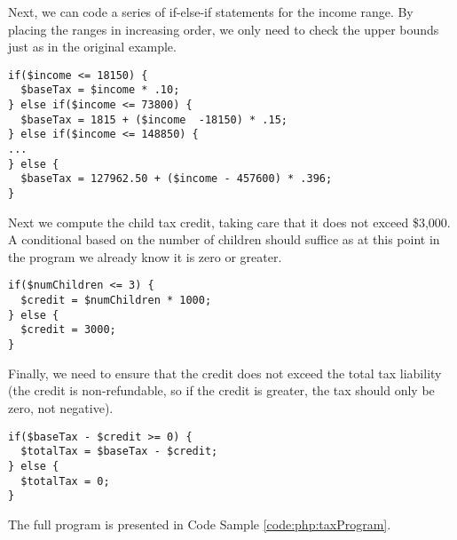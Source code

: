 Next, we can code a series of if-else-if statements for the income range.  By
placing the ranges in increasing order, we only need to check the upper bounds
just as in the original example.

\begin{verbatim}
if($income <= 18150) {
  $baseTax = $income * .10;
} else if($income <= 73800) {
  $baseTax = 1815 + ($income  -18150) * .15;
} else if($income <= 148850) {
...
} else {
  $baseTax = 127962.50 + ($income - 457600) * .396;
}
\end{verbatim}

Next we compute the child tax credit, taking care that it does
not exceed \$3,000.  A conditional based on the number of children
should suffice as at this point in the program we already know it is
zero or greater.

\begin{verbatim}
if($numChildren <= 3) {
  $credit = $numChildren * 1000;
} else {
  $credit = 3000;
}
\end{verbatim}

Finally, we need to ensure that the credit does not exceed the total tax
liability (the credit is non-refundable, so if the credit is greater, the tax
should only be zero, not negative).  

\begin{verbatim}
if($baseTax - $credit >= 0) {
  $totalTax = $baseTax - $credit;
} else {
  $totalTax = 0;
}
\end{verbatim}

The full program is presented in Code Sample \ref{code:php:taxProgram}.

